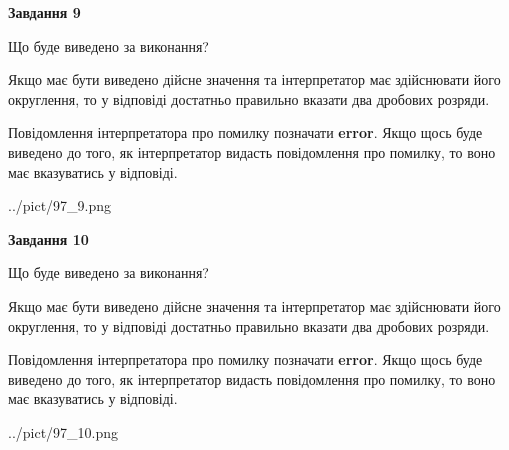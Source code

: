 \documentclass[12pt, ukrainian]{article}
\begin{document}
{\begin {Large}
{\begin {center}\textbf{Завдання 9}\end {center}}\par
Що буде виведено за виконання? \par

Якщо має бути виведено дійсне значення та інтерпретатор має здійснювати його округлення, 
то у відповіді достатньо правильно вказати два дробових розряди.

Повідомлення інтерпретатора про помилку позначати \textbf{error}.
Якщо щось буде виведено до того, як інтерпретатор видасть повідомлення про помилку, 
то воно має вказуватись у відповіді. \par

\begin{center}
	{../pict/97_9.png}
\end{center}
\newpage

{\begin {center}\textbf{Завдання 10}\end {center}}\par
Що буде виведено за виконання? \par

Якщо має бути виведено дійсне значення та інтерпретатор має здійснювати його округлення, 
то у відповіді достатньо правильно вказати два дробових розряди.

Повідомлення інтерпретатора про помилку позначати \textbf{error}.
Якщо щось буде виведено до того, як інтерпретатор видасть повідомлення про помилку, 
то воно має вказуватись у відповіді. \par

\begin{center}
	{../pict/97_10.png}
\end{center}
\newpage

\end {Large}}
\end{document}
